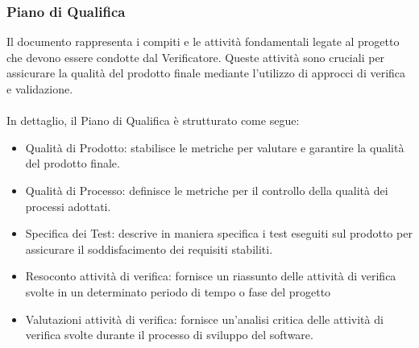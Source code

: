 \documentclass{article}
\begin{document}
\subsubsection{Piano di Qualifica}
Il documento rappresenta i compiti e le attività fondamentali legate al progetto che devono essere condotte dal Verificatore. Queste attività sono cruciali per assicurare la qualità del prodotto finale mediante l'utilizzo di approcci di verifica e validazione.\\\\
In dettaglio, il Piano di Qualifica è strutturato come segue:
\begin{itemize}
    \item Qualità di Prodotto: stabilisce le metriche per valutare e garantire la qualità del prodotto finale.
    \item Qualità di Processo: definisce le metriche per il controllo della qualità dei processi adottati.
    \item Specifica dei Test: descrive in maniera specifica i test eseguiti sul prodotto per assicurare il soddisfacimento dei requisiti stabiliti.
    \item Resoconto attività di verifica: fornisce un riassunto delle attività di verifica svolte in un determinato periodo di tempo o fase del progetto
    \item Valutazioni attività di verifica: fornisce un'analisi critica delle attività di verifica svolte durante il processo di sviluppo del software.
\end{itemize}
\end{document}
